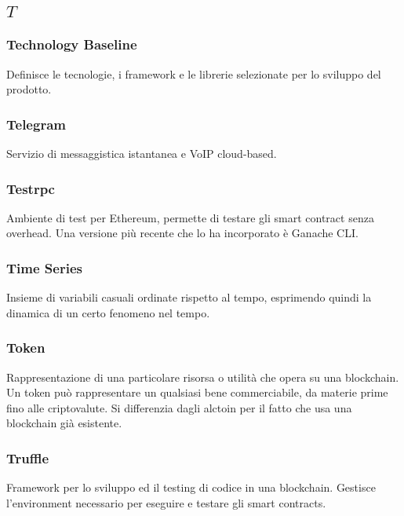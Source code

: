 \subsection*{\quad$T\quad$}
\subsubsection*{Technology Baseline}
Definisce le tecnologie, i framework e le librerie selezionate per lo sviluppo del prodotto.

\subsubsection*{Telegram}
Servizio di messaggistica istantanea  e VoIP cloud-based.

\subsubsection*{Testrpc}
Ambiente di test per Ethereum, permette di testare gli smart contract senza overhead. Una versione più recente che lo ha incorporato è Ganache CLI\glo.

\subsubsection*{Time Series}
Insieme di variabili casuali ordinate rispetto al tempo, esprimendo quindi la dinamica di un certo fenomeno nel tempo.

\subsubsection*{Token}
Rappresentazione di una particolare risorsa o utilità che opera su una blockchain\glo. Un token può rappresentare un qualsiasi bene commerciabile, da materie prime fino alle criptovalute. Si differenzia dagli alctoin per il fatto che usa una blockchain già esistente.

\subsubsection*{Truffle}
Framework per lo sviluppo ed il testing di codice in una blockchain\glo. Gestisce l'environment necessario per eseguire e testare gli smart contracts\glo.

